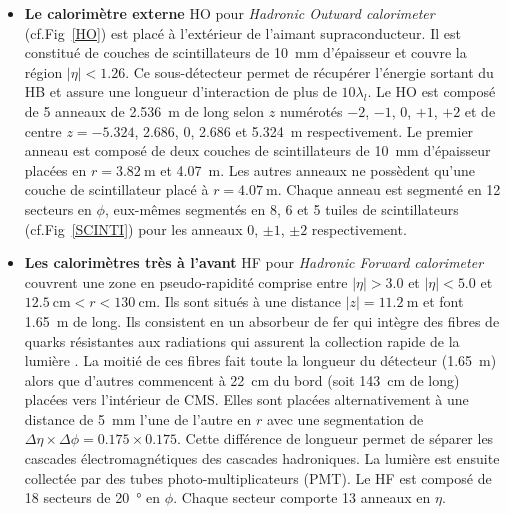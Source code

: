 \begin{itemize}[label=$\bullet$]
	\item \textbf{Le calorimètre externe} HO pour \textit{Hadronic Outward calorimeter} (cf.Fig~\ref{HO}) est placé à l'extérieur de l'aimant supraconducteur. Il est constitué de couches de scintillateurs de \SI{10}{\milli\meter} d'épaisseur et couvre la région $|\eta|<\num{1.26}$. Ce sous-détecteur permet de récupérer l'énergie sortant du HB et assure une longueur d'interaction de plus de $\num{10}\lambda_{l}$. Le HO est composé de \num{5} anneaux de \SI{2.536}{\meter} de long selon $z$ numérotés $-\num{2}$, $-\num{1}$, \num{0}, $+\num{1}$, $+\num{2}$ et de centre $z=-\num{5.324}$, \num{2.686}, \num{0}, \num{2.686} et \SI{5.324}{\meter} respectivement. Le premier anneau est composé de deux couches de scintillateurs de \SI{10}{\milli\meter} d'épaisseur placées en $r=\SI{3.82}{\meter}$ et \SI{4.07}{\meter}. Les autres anneaux ne possèdent qu'une couche de scintillateur placé à $r=\SI{4.07}{\meter}$. Chaque anneau est segmenté en \num{12} secteurs en $\phi$, eux-mêmes segmentés en \num{8}, \num{6} et \num{5} tuiles de scintillateurs (cf.Fig~\ref{SCINTI}) pour les anneaux \num{0}, $\pm\num{1}$, $\pm\num{2}$ respectivement.
	\item \textbf{Les calorimètres très à l'avant} HF pour \textit{Hadronic Forward calorimeter} couvrent une zone en pseudo-rapidité comprise entre $|\eta|>\num{3.0}$ et $|\eta|<\num{5.0}$ et $\SI{12.5}{\centi\meter}<r<\SI{130}{\centi\meter}$. Ils sont situés à une distance $|z|=\SI{11.2}{\meter}$ et font \SI{1.65}{\meter} de long. Ils consistent en un absorbeur de fer qui intègre des fibres de quarks résistantes aux radiations qui assurent la collection rapide de la lumière . La moitié de ces fibres fait toute la longueur du détecteur (\SI{1.65}{\meter}) alors que d'autres commencent à \SI{22}{\centi\meter} du bord (soit \SI{143}{\centi\meter} de long) placées vers l'intérieur de CMS. Elles sont placées alternativement à une distance de \SI{5}{\milli\meter} l'une de l'autre en $r$  avec une segmentation de $\Delta\eta\times\Delta\phi=\num{0.175}\times\num{0.175}$. Cette différence de longueur permet de séparer les cascades électromagnétiques des cascades hadroniques. La lumière est ensuite collectée par des tubes photo-multiplicateurs (PMT). Le HF est composé de \num{18} secteurs de \SI{20}{\degree} en $\phi$. Chaque secteur comporte \num{13} anneaux en $\eta$.
\end{itemize}
